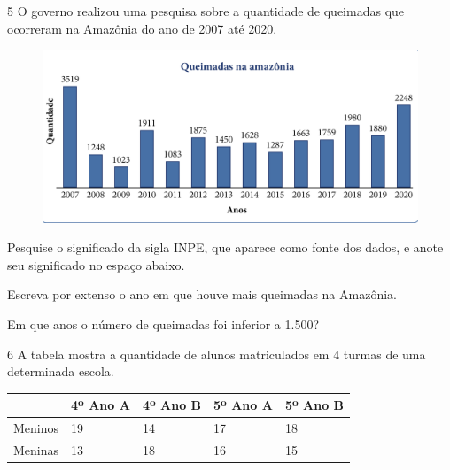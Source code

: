 
\num{5} O governo realizou uma pesquisa sobre a quantidade de queimadas
que ocorreram na Amazônia do ano de 2007 até 2020.

\begin{figure}[htpb!]
\centering
\includegraphics[width=.9\textwidth]{../ilustracoes/MAT5/SAEB_5ANO_MAT_figura105.png}
\end{figure}

\pagebreak

\begin{escolha}
\item
  Pesquise o significado da sigla INPE, que aparece como fonte dos dados,
  e anote seu significado no espaço abaixo.\\

\item
  Escreva por extenso o ano em que houve mais queimadas na Amazônia.\\

\item
  Em que anos o número de queimadas foi inferior a 1.500?\\
\end{escolha}

\num{6} A tabela mostra a quantidade de alunos matriculados em 4 turmas de
uma determinada escola.

\begin{longtable}[]{@{}lllll@{}}
\toprule
& 4º Ano A & 4º Ano B & 5º Ano A & 5º Ano B\tabularnewline
\midrule
\endhead
Meninos & 19 & 14 & 17 & 18\tabularnewline
Meninas & 13 & 18 & 16 & 15\tabularnewline
\bottomrule
\end{longtable}

